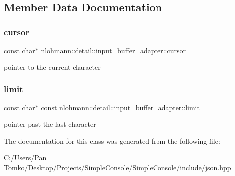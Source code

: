 \subsection{Member Data Documentation}
\mbox{\label{classnlohmann_1_1detail_1_1input__buffer__adapter_a49e6c8b6555af489a45ef51737eafa1c}} 
\subsubsection{\texorpdfstring{cursor}{cursor}}
{\footnotesize\ttfamily const char$\ast$ nlohmann\+::detail\+::input\+\_\+buffer\+\_\+adapter\+::cursor\hspace{0.3cm}{\ttfamily [private]}}



pointer to the current character 

\mbox{\label{classnlohmann_1_1detail_1_1input__buffer__adapter_abbea9cdb1862e55bc1e142a72a947da4}} 
\subsubsection{\texorpdfstring{limit}{limit}}
{\footnotesize\ttfamily const char$\ast$ const nlohmann\+::detail\+::input\+\_\+buffer\+\_\+adapter\+::limit\hspace{0.3cm}{\ttfamily [private]}}



pointer past the last character 



The documentation for this class was generated from the following file\+:\begin{DoxyCompactItemize}
\item 
C\+:/\+Users/\+Pan Tomko/\+Desktop/\+Projects/\+Simple\+Console/\+Simple\+Console/include/\mbox{\hyperlink{json_8hpp}{json.\+hpp}}\end{DoxyCompactItemize}
